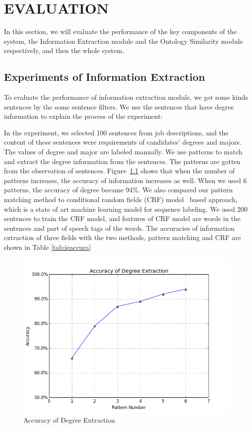 \chapter{EVALUATION}

In this section, we will evaluate the performance of the key components of the system, the Information Extraction module and the Ontology Similarity module respectively, and then the whole system.

\section{Experiments of Information Extraction }

To evaluate the performance of information extraction module, we get some kinds sentences by the some sentence filters. We use the sentences that have degree information to explain the process of the experiment:

In the experiment, we selected 100 sentences from job descriptions, and the content of these sentences were requirements of candidates' degrees and majors. The values of degree and major are labeled manually. We use patterns to  match and extract the degree information from the sentences. The patterns are gotten from the observation of sentences. Figure~\ref{fig:degree_accuracy} shows that when the number of  patterns increases, the accuracy of information increases as well. When we used 6 patterns, the accuracy of degree became 94\%. We also compared our pattern matching method to conditional random fields (CRF) model~\cite{lafferty2001conditional}  based approach, which is a state of art machine learning model for sequence labeling. We used 200 sentences to train the CRF model, and features of CRF model are words in the sentences and part of speech tags of the words. The accuracies of information extraction of three fields with the two methods, pattern matching and CRF are shown in Table \ref{tab:ieaccura}

\begin{figure}[htbp]
  \centering
  \includegraphics[scale=0.5]{images/degree_accuracy.png}
  \caption{Accuracy of Degree Extraction  }
  \label{fig:degree_accuracy}
\end{figure}


